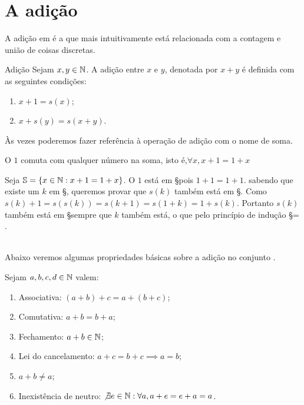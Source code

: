 \documentclass[../main.tex]{subfiles}
\begin{document}


\section{A adição}
A adição em \N é a que mais intuitivamente está relacionada com a contagem e união de coisas discretas.
\begin{defi}{Adição}\label{def-adicao-N}
Sejam $x, y \in \mathbb{N}$. A adição entre $x$ e $y$, denotada por $x + y$ é definida com as seguintes condições: 
    \begin{enumerate}[label=(\roman*)]
        \item $x + 1 = s(x)$;
        \item $x + s(y) = s(x+y)$.
    \end{enumerate}
\end{defi}
Às vezes poderemos fazer referência à operação de adição com o nome de soma.
\begin{lema}\label{soma-n-um-comut}
    O $1$ comuta com qualquer número na soma, isto é,$ \forall x, x + 1 = 1 + x$
\end{lema}
\begin{dem}
    Seja $\mathbb{S} = \{ x \in \mathbb{N} : x + 1 = 1 + x\}$. O $1$ está em \S pois $1 + 1 = 1 + 1$.
    sabendo que existe um $k$ em \S, queremos provar que $s(k)$ também está em \S. Como
    $s(k) + 1 = s(s(k)) = s(k+1) = s(1+k) = 1 + s(k)$. Portanto $s(k)$ também está em \S sempre que $k$ também está, o que pelo princípio de indução \S = \N.
\end{dem} \\

Abaixo veremos algumas propriedades básicas sobre a adição no conjunto \N.
\begin{prop}{Sejam $a, b, c, d \in \mathbb{N}$ valem:}\label{soma-props}
    \begin{enumerate}[label=(\roman*)]
    	\item Associativa: $(a + b) + c = a + (b + c)$;
    	\item Comutativa: $a + b =  b + a$;
        \item Fechamento: $a + b \in \mathbb{N}$;
        \item Lei do cancelamento: $a + c = b + c \implies a = b$;
        \item $a + b \neq a$;
    	\item Inexistência de neutro: $\not\exists e \in \mathbb{N} : \forall a, a + e = e + a = a$.
    \end{enumerate}
\end{prop}
\end{document}
